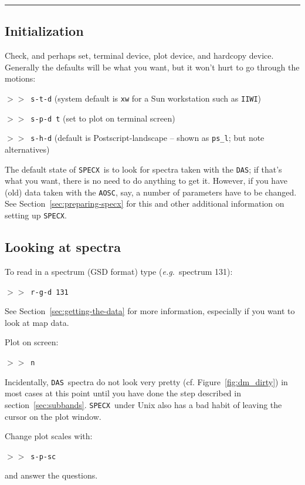 \documentclass[11pt,twoside]{article}
\newcommand{\eg}{{\it e.g.}}
\newcommand{\SPECX}{{\tt SPECX}}
\newcommand{\das}{{\tt DAS}}
\newcommand{\aosc}{{\tt AOSC}}
\newcommand{\margnote}[1]
{\marginpar{({\it{\ref{#1}}})}}
\newcommand{\SP}{{$>\!>$}}
\newcommand{\myline}
{\vspace*{-0.2in}\begin{center}\rule{3.0in}{0.015in}\end{center}}
\begin{document}
\myline
 
\subsection{Initialization}
\label{sec:specx-init}
\margnote{sec:preparing-specx}
Check, and perhaps set, terminal device,
plot device, and hardcopy device. Generally the defaults will be what
you want, but it won't hurt to go through the motions:

\SP\ {\tt{s-t-d}} \hspace*{0.5in}(system default is {\tt{xw}} for a 
Sun workstation such as {\tt{IIWI}})

\SP\ {\tt{s-p-d t}} \hspace*{0.35in}(set to plot on terminal screen)

\SP\ {\tt{s-h-d}} \hspace*{0.5in}(default is Postscript-landscape --
shown as {\verb|ps_l|}; but note alternatives)

The default state of \SPECX\ is to look for spectra taken with the
\das ; if that's what you want, there is no need to do anything to get
it. However, if you have (old) data taken with the \aosc , say, a
number of parameters have to be changed. See
Section~\ref{sec:preparing-specx} for this and other additional
information on setting up \SPECX .

\normalmarginpar
\subsection{Looking at spectra}
To read in a spectrum (GSD format)\margnote{sec:getting-the-data} type
(\eg\ spectrum 131):

\SP\ {\tt{r-g-d 131}}

See Section~\ref{sec:getting-the-data} for more information,
especially if you want to look at map data.

Plot on screen:

\SP\ {\tt{n}}

Incidentally, \das\ spectra do not look very pretty (cf.
Figure~\ref{fig:dm_dirty}) in most cases at this point until you have
done the step described in section~\ref{sec:subbands}. \SPECX\ under
Unix also has a bad habit of leaving the cursor on the plot window.

Change plot scales\margnote{sec:specx_5.1} with:

\SP\ {\tt{s-p-sc}} 

and answer the questions.
\end{document}
